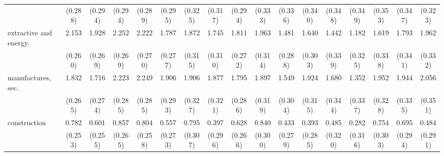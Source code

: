 {\begin{tabular}{l*{16}{c}}
                    &     (0.288)         &     (0.294)         &     (0.294)         &     (0.289)         &     (0.295)         &     (0.325)         &     (0.317)         &     (0.294)         &     (0.333)         &     (0.336)         &     (0.340)         &     (0.348)         &     (0.349)         &     (0.353)         &     (0.347)         &     (0.323)         \\
[1em]
extractive and energy.&       2.153\sym{***}&       1.928\sym{***}&       2.252\sym{***}&       2.222\sym{***}&       1.787\sym{***}&       1.872\sym{***}&       1.745\sym{***}&       1.811\sym{***}&       1.963\sym{***}&       1.481\sym{***}&       1.640\sym{***}&       1.442\sym{***}&       1.182\sym{***}&       1.619\sym{***}&       1.793\sym{***}&       1.962\sym{***}\\
                    &     (0.260)         &     (0.269)         &     (0.269)         &     (0.270)         &     (0.277)         &     (0.315)         &     (0.310)         &     (0.272)         &     (0.314)         &     (0.288)         &     (0.303)         &     (0.339)         &     (0.325)         &     (0.338)         &     (0.341)         &     (0.332)         \\
[1em]
manufactures, sec.  &       1.832\sym{***}&       1.716\sym{***}&       2.223\sym{***}&       2.249\sym{***}&       1.906\sym{***}&       1.906\sym{***}&       1.877\sym{***}&       1.795\sym{***}&       1.897\sym{***}&       1.549\sym{***}&       1.924\sym{***}&       1.680\sym{***}&       1.352\sym{***}&       1.952\sym{***}&       1.944\sym{***}&       2.056\sym{***}\\
                    &     (0.265)         &     (0.274)         &     (0.285)         &     (0.285)         &     (0.293)         &     (0.327)         &     (0.321)         &     (0.286)         &     (0.319)         &     (0.304)         &     (0.315)         &     (0.344)         &     (0.337)         &     (0.328)         &     (0.335)         &     (0.351)         \\
[1em]
construction        &       0.782\sym{**} &       0.601\sym{*}  &       0.857\sym{**} &       0.804\sym{**} &       0.557\sym{*}  &       0.795\sym{**} &       0.397         &       0.628\sym{*}  &       0.840\sym{**} &       0.433         &       0.393         &       0.485         &       0.282         &       0.754\sym{*}  &       0.695\sym{*}  &       0.484         \\
                    &     (0.253)         &     (0.255)         &     (0.265)         &     (0.258)         &     (0.273)         &     (0.307)         &     (0.296)         &     (0.266)         &     (0.300)         &     (0.279)         &     (0.285)         &     (0.320)         &     (0.316)         &     (0.303)         &     (0.294)         &     (0.291)         \\

\end{tabular}}
